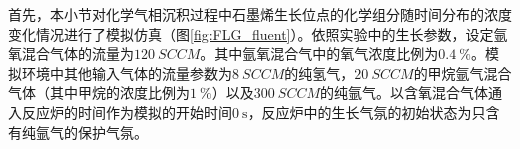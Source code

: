 首先，本小节对化学气相沉积过程中石墨烯生长位点的化学组分随时间分布的浓度变化情况进行了模拟仿真（图\ref{fig:FLG_fluent}）。依照实验中的生长参数，设定氩氧混合气体的流量为$\SI{120}{SCCM}$。其中氩氧混合气中的氧气浓度比例为$\SI{0.4}{\percent}$。模拟环境中其他输入气体的流量参数为$\SI{8}{SCCM}$的纯氢气，$\SI{20}{SCCM}$的甲烷氩气混合气体（其中甲烷的浓度比例为$\SI{1}{\percent}$）以及$\SI{300}{SCCM}$的纯氩气。以含氧混合气体通入反应炉的时间作为模拟的开始时间$\SI{0}{\second}$，反应炉中的生长气氛的初始状态为只含有纯氩气的保护气氛。

\begin{figure}[htb]
    \centering
\end{figure}
